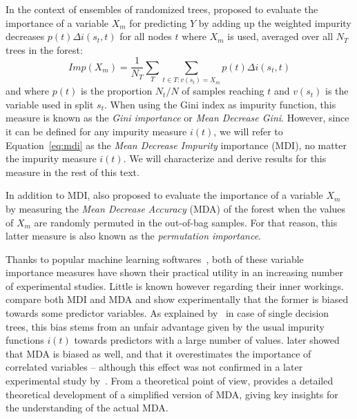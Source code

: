 \documentclass{article}
\begin{document}


In the context of ensembles of randomized trees,
\cite{breiman2001rf,breiman2002manual} proposed to evaluate the importance of
a variable $X_m$  for predicting  $Y$ by adding up the weighted impurity decreases $p(t) \Delta
i(s_t, t)$ for all nodes $t$ where $X_m$ is used, averaged over all $N_T$ trees
in the forest:
\begin{equation}\label{eq:mdi}
Imp(X_m) = \frac{1}{N_T} \sum_{T} \sum_{t \in T:v(s_t) = X_m} p(t) \Delta i(s_t, t)
\end{equation}
and where $p(t)$ is the proportion $N_t / N$ of samples
reaching $t$ and $v(s_t)$ is the variable used in split $s_t$. When
using the Gini index as impurity function, this measure is known as the
\textit{Gini importance} or \textit{Mean Decrease Gini}. However, since it can
be defined for any impurity measure $i(t)$, we will refer to Equation~\ref{eq:mdi}
as the \textit{Mean Decrease Impurity} importance (MDI), no matter the impurity
measure $i(t)$. We will characterize and derive results for this measure in the
rest of this text.

In addition to MDI,
\cite{breiman2001rf,breiman2002manual} also proposed to evaluate the importance
of a variable $X_m$ by measuring the \textit{Mean Decrease Accuracy} (MDA) of
the forest when the values of $X_m$ are randomly permuted in the out-of-bag
samples. For that reason, this latter measure is also known as the
\textit{permutation importance}.

Thanks to popular machine learning
softwares~\citep{breiman2002manual,liaw2002classification,pedregosa2011scikit},
both of these variable importance measures have shown their practical utility in
an increasing number of experimental studies. Little is known however regarding
their inner workings. \cite{strobl2007bias} compare both MDI and MDA and show
experimentally that the former is biased towards some predictor variables. As
explained by~\cite{white1994technical} in case of single decision trees, this
bias stems from an unfair advantage given by the usual impurity functions $i(t)$
towards predictors with a large number of values. \cite{strobl2008conditional}
later showed  that MDA is biased as well, and that it overestimates the
importance of correlated variables -- although this effect was not confirmed in
a later experimental study by~\cite{genuer2010variable}.  From a theoretical
point of view, \cite{ishwaran2007variable} provides a detailed theoretical
development of a simplified version of MDA, giving key insights for the
understanding of the actual MDA.
\end{document}
